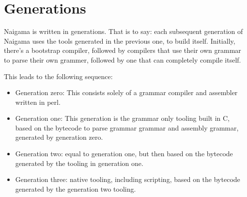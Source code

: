 \section{Generations}

Naigama is written in generations. That is to say:
each subsequent generation of Naigama uses the tools generated
in the previous one, to build itself.
Initially, there's a bootstrap compiler, followed by compilers
that use their own grammar to parse their own grammer, followed
by one that can completely compile itself.

This leads to the following sequence:

\begin{itemize}

\item{Generation zero: This consists solely of a grammar compiler
      and assembler written in perl.}

\item{Generation one: This generation is the grammar only tooling
      built in C, based on the bytecode to parse grammar grammar
      and assembly grammar, generated by generation zero.}

\item{Generation two: equal to generation one, but then based on
      the bytecode generated by the tooling in generation one.}

\item{Generation three: native tooling, including scripting,
      based on the bytecode generated by the generation two tooling.}

\end{itemize}
